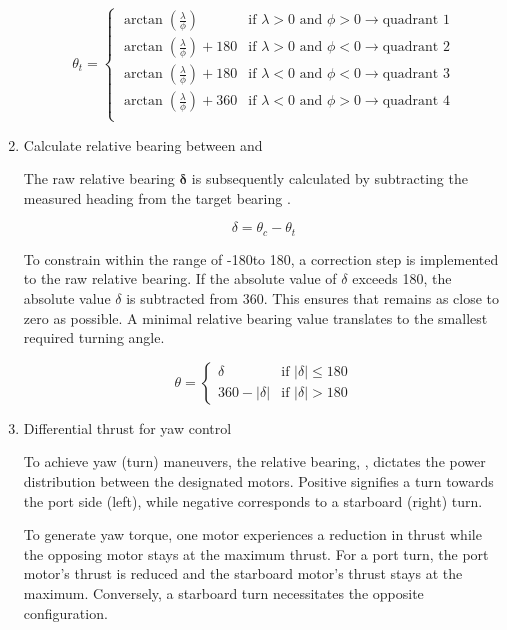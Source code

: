 \begin{enumerate}
        $$ \theta_t = \begin{cases}
            \arctan(\frac{\lambda}{\phi})       & \text{if } \lambda > 0 \text{ and } \phi > 0 \rightarrow \text{quadrant 1} \\
            \arctan(\frac{\lambda}{\phi}) + 180 & \text{if } \lambda > 0 \text{ and } \phi < 0 \rightarrow \text{quadrant 2} \\
            \arctan(\frac{\lambda}{\phi}) + 180 & \text{if } \lambda < 0 \text{ and } \phi < 0 \rightarrow \text{quadrant 3} \\
            \arctan(\frac{\lambda}{\phi}) + 360 & \text{if } \lambda < 0 \text{ and } \phi > 0 \rightarrow \text{quadrant 4} \\
          \end{cases} $$

  \item Calculate relative bearing \rBearing between \bearing and \heading

        The raw relative bearing $\boldsymbol{\delta}$ is subsequently calculated by subtracting the measured heading \heading from the target bearing \bearing.

        $$ \delta = \theta_c - \theta_t $$

        To constrain \rBearing within the range of -180\degrees \space to 180\degrees, a correction step is implemented to the raw relative bearing. If the absolute value of $\delta$ exceeds
        180\degrees, the absolute value $\delta$ is subtracted from 360\degrees. This ensures that \rBearing remains as close to zero as possible.
        A minimal relative bearing value translates to the smallest required turning angle.

        $$ \theta = \begin{cases}
            \delta         & \text{if } |\delta| \leq 180 \\
            360 - |\delta| & \text{if } |\delta| > 180
          \end{cases} $$

  \item Differential thrust for yaw control
  
        To achieve yaw (turn) maneuvers, the relative bearing, \rBearing, dictates the power distribution between the designated motors. Positive \rBearing signifies a turn
        towards the port side (left), while negative \rBearing corresponds to a starboard (right) turn.

        To generate yaw torque, one motor experiences a reduction in thrust while the opposing motor stays at the maximum thrust. For a port turn, the port motor's thrust is reduced
        and the starboard motor's thrust stays at the maximum. Conversely, a starboard turn necessitates the opposite configuration.


\end{enumerate}
